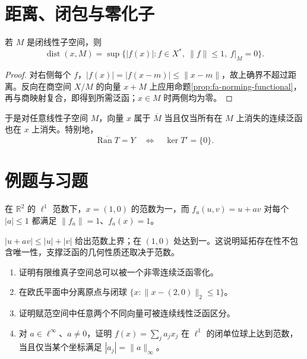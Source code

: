 \section{距离、闭包与零化子}
\begin{proposition}\label{prop:fa-distance-dual}
若 $M$ 是闭线性子空间，则
\[
 \operatorname{dist}(x,M)=
 \sup\{|f(x)|:f\in X^*,\ \|f\|\leq1,\ f|_M=0\}.
\]
\end{proposition}
\begin{proof}
对右侧每个 $f$，$|f(x)|=|f(x-m)|\leq\|x-m\|$，故上确界不超过距离。反向在商空间 $X/M$ 的向量 $x+M$ 上应用命题\ref{prop:fa-norming-functional}，再与商映射复合，即得到所需泛函；$x\in M$ 时两侧均为零。
\end{proof}
于是对任意线性子空间 $M$，向量 $x$ 属于 $\overline M$ 当且仅当所有在 $M$ 上消失的连续泛函也在 $x$ 上消失。特别地，
\[
 \overline{\operatorname{Ran}T}=Y\quad\Longleftrightarrow\quad\ker T'=\{0\}.
\]

\section{例题与习题}
\begin{example}[支撑泛函可以不唯一]
在 $\mathbb R^2$ 的 $\ell^1$ 范数下，$x=(1,0)$ 的范数为一，而 $f_a(u,v)=u+av$ 对每个 $|a|\leq1$ 都满足 $\|f_a\|=1$、$f_a(x)=1$。
\end{example}
\begin{solve}
$|u+av|\leq|u|+|v|$ 给出范数上界；在 $(1,0)$ 处达到一。这说明延拓存在性不包含唯一性，支撑泛函的几何性质还取决于范数。
\end{solve}
\begin{enumerate}
 \item 证明有限维真子空间总可以被一个非零连续泛函零化。
 \item 在欧氏平面中分离原点与闭球 $\{x:\|x-(2,0)\|_2\leq1\}$。
 \item 证明赋范空间中任意两个不同向量可被连续线性泛函区分。
 \item 对 $a\in\ell^\infty$、$a\ne0$，证明 $f(x)=\sum_ja_jx_j$ 在 $\ell^1$ 的闭单位球上达到范数，当且仅当某个坐标满足 $|a_j|=\|a\|_\infty$。
\end{enumerate}

